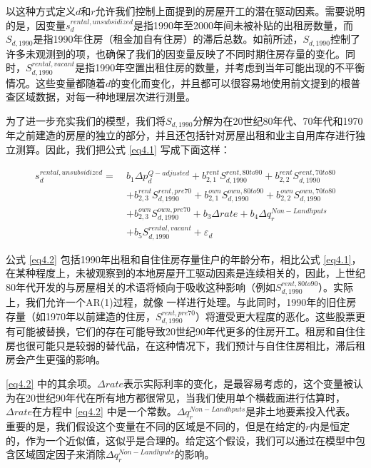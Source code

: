 \documentclass[lang=cn,11pt,a4paper]{paper}
\begin{document}
以这种方式定义$d$和$r$允许我们控制上面提到的房屋开工的潜在驱动因素。需要说明的是，因变量$s_{d}^{rental,unsubsidized}$是指1990年至2000年间未被补贴的出租房数量，而$S_{d,1990}$是指1990年住房（租金加自有住房）的滞后总数。如前所述，$S_{d, 1990}$控制了许多未观测到的项，也确保了我们的因变量反映了不同时期住房存量的变化。同时，$S_{d, 1990}^{rental, vacant}$是指1990年空置出租住房的数量，并考虑到当年可能出现的不平衡情况。这些变量都随着$d$的变化而变化，并且都可以很容易地使用前文提到的根普查区域数据，对每一种地理层次进行测量。

为了进一步充实我们的模型，我们将$S_{d,1990}$分解为在20世纪80年代、70年代和1970年之前建造的房屋的独立的部分，并且还包括针对房屋出租和业主自用库存进行独立测算。因此，我们把公式 \eqref{eq4.1} 写成下面这样：

\begin{equation}\label{eq4.2}
\begin{aligned}
  s_{d}^{rental,unsubsidized}=\ & b_{1} \Delta p_{d}^{Q-adjusted}+b_{2,1}^{rent} S_{d, 1990}^{rent, 80 t o 90}+b_{2,2}^{rent} S_{d, 1990}^{rent, 70 to 80} \\
  &+b_{2,3}^{rent} S_{d, 1990}^{rent, pre 70}+b_{2,1}^{own} S_{d, 1990}^{own, 80 to 90}+b_{2,2}^{own} S_{d, 1990}^{own, 70 to 80} \\
  &+b_{2,3}^{own} S_{d, 1990}^{own, pre 70}+b_{3} \Delta rate+b_{4} \Delta q_{r}^{Non-Landhputs} \\
  &+b_{5} S_{d, 1990}^{rental,vacant}+\varepsilon_{d}
  \end{aligned}
\end{equation}

公式 \eqref{eq4.2} 包括1990年出租和自住住房存量住户的年龄分布，相比公式 \eqref{eq4.1}，在某种程度上，未被观察到的本地房屋开工驱动因素是连续相关的，因此，上世纪80年代开发的与房屋相关的术语将倾向于吸收这种影响（例如$S_{d, 1990}^{rent, 80 to 90}$）。实际上，我们允许一个AR(1)过程，就像 \cite{Mayer200085} 一样进行处理。与此同时，1990年的旧住房存量（如1970年以前建造的住房，$S_{d, 1990}^{rent, pre70}$）将遭受更大程度的恶化。这些股票更有可能被替换，它们的存在可能导致20世纪90年代更多的住房开工。租房和自住住房也很可能只是较弱的替代品，在这种情况下，我们预计与自住住房相比，滞后租房会产生更强的影响。

\eqref{eq4.2} 中的其余项。$\Delta rate$表示实际利率的变化，是最容易考虑的，这个变量被认为在20世纪90年代在所有地方都很常见，当我们使用单个横截面进行估算时，$\Delta rate$在方程中 \eqref{eq4.2} 中是一个常数。$\Delta q_{r}^{Non-Landhputs}$是非土地要素投入代表。重要的是，我们假设这个变量在不同的区域是不同的，但是在给定的$r$内是恒定的，作为一个近似值，这似乎是合理的。给定这个假设，我们可以通过在模型中包含区域固定因子来消除$\Delta q_{r}^{Non-Landhputs}$的影响。
\end{document}

